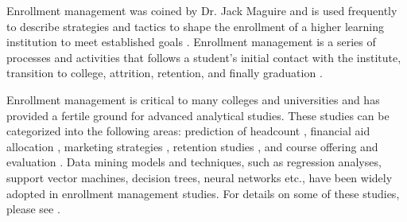 \documentclass[12pt,english]{report}
\begin{document}
Enrollment management was coined by Dr. Jack Maguire \citep{maguire1976organized} and is used frequently to describe strategies and tactics to shape the enrollment of a higher learning institution to meet established goals \citep{kemerer1982strategies}.
Enrollment management is a series of processes and activities that follows a student's initial contact with the institute, transition to college, attrition, retention, and finally graduation \citep{hossler1990strategic}.



Enrollment management is critical to many colleges and universities \citep{braunstein1999measuring,maltzdecision,aksenovaenrollment} and has provided a fertile ground for advanced analytical studies. These studies can be categorized into the following areas: prediction of headcount \citep{aksenovaenrollment,changapplying2006}, financial aid allocation \citep{leedsthe2014,jacksonfinancial,dynarski1999does}, marketing strategies \citep{pandeyAdvertise}, retention studies \citep{grossinstitutional2015,dynarski1999does}, and course offering and evaluation \citep{SurjeetClassEnroll,luan2006courseoffer}. Data mining models and techniques, such as regression analyses, support vector machines, decision trees, neural networks etc., have been widely adopted in enrollment management studies. For details on some of these studies, please see \citep{luan2006data}.

\end{document}
